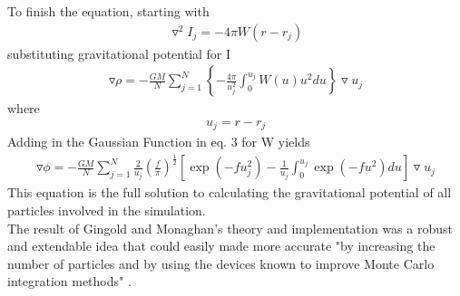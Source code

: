 \documentclass{sigchi}
\begin{document}
To finish the equation, starting with
\begin{align}
\triangledown^2I_j = -4 \pi W(r - r_j)
\end{align}
substituting gravitational potential for I
\begin{align}
\triangledown \rho = - \frac{GM}{N} \sum_{j=1}^N \left \lbrace - \frac{4 \pi}{u_j^2} \int_{0}^{u_j} 
W(u) u^2 du \right \rbrace \triangledown u_j
\end{align}
where
\begin{align}
u_j = r - r_j
\end{align}
Adding in the Gaussian Function in eq. 3 for W yields
\begin{align}
\triangledown \phi = - \frac{GM}{N} \sum_{j=1}^N \frac{2}{u_j} \left ( \frac{f}{\pi} \right )^\frac{1}{2} 
\left \lbrack \exp{(-f u_j^2)} - \frac{1}{u_j} \int_{0}^{u_j} \exp{(-f u^2)} du \right \rbrack 
\triangledown u_j
\end{align}
This equation is the full solution to calculating the gravitational potential of all particles
involved in the simulation.
\\
\hspace*{6 pt} The result of Gingold and Monaghan's theory and implementation was a robust 
and extendable idea that could easily made more accurate "by increasing the number of particles 
and by using the devices known to improve Monte Carlo integration methods" \cite{sphastrophysics}.
%
\end{document}
